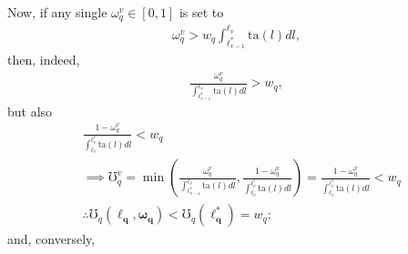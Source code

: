 \documentclass[hidelinks, nonatbib]{elsarticle}
\begin{document}
Now, if any single $\omega_{q}^{v} \in [0,1]$ is set to
\begin{gather}
    \omega_{q}^{v} > 
    w_q
    \int_{
        \ell_{v-1}^{*}
    }^{
        \ell_{v}
    }{
        \text{ta}(l)
        dl
    }
    ,
\end{gather}
then, indeed,
\begin{gather}
    \frac{
        \omega_{q}^{v}
    }{
        \int_{
            \ell_{v-1}^{*}
        }^{
            \ell_{v}
        }{
            \text{ta}(l)dl
        }
    }
    >
    w_q
    ,
\end{gather}
but also
\begin{align}
    &
    \frac{
        1 - \omega_{q}^{v}
    }{
        \int_{
            \ell_{v}
        }^{
            \ell_{v}^{*}
        }{
            \text{ta}(l)dl
        }
    }
    <
    w_q
    \\
    &\implies
    \mho_{q}^{v} = 
    \min\left(
        \frac{
            \omega_{q}^{v}
        }{
            \int_{
                \ell_{v-1}^{*}
            }^{
                \ell_{v}
            }
            \text{ta}(l)dl
        }
        ,
        \frac{
            1-\omega_{q}^{v}
        }{
            \int_{
                \ell_{v}
            }^{
                \ell_{v}^{*}
            }
            \text{ta}(l)dl
        }
    \right)
    =
    \frac{
        1 - \omega_{q}^{v}
    }{
        \int_{
            \ell_{v}
        }^{
            \ell_{v}^{*}
        }{
            \text{ta}(l)dl
        }
    }
    <
    w_q
    \\
    &\therefore
    \mho_{q}(
        \boldsymbol{\ell_q}
        ,\boldsymbol{\omega_q}
    ) 
    <
    \mho_{q}(
        \boldsymbol{\ell_{q}^{*}}
    )
    =
    w_q
    ;
\end{align}
and, conversely, 
\end{document}
